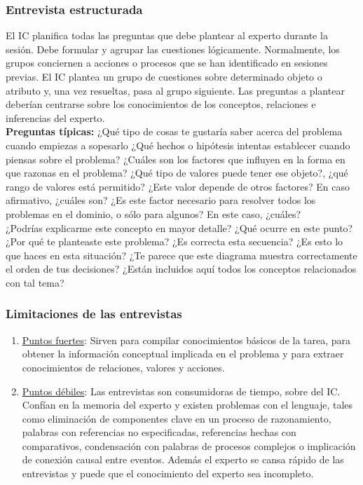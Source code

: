 \documentclass[12pt]{article}
\begin{document}
\subsubsection{Entrevista estructurada}
El IC planifica todas las preguntas que debe plantear al experto durante la sesión. Debe formular y agrupar las cuestiones lógicamente. Normalmente, los grupos conciernen a acciones o procesos que se han identificado en sesiones previas. El IC plantea un grupo de cuestiones sobre determinado objeto o atributo y, una vez resueltas, pasa al grupo siguiente. Las preguntas a plantear deberían centrarse sobre los conocimientos de los conceptos, relaciones e inferencias del experto.\\
\textbf{Preguntas típicas:} ¿Qué tipo de cosas te gustaría saber acerca del problema cuando empiezas a sopesarlo ¿Qué hechos o hipótesis intentas establecer cuando piensas sobre el problema? ¿Cuáles son los factores que influyen en la forma en que razonas en el problema? ¿Qué tipo de valores puede tener ese objeto?, ¿qué rango de valores está permitido? ¿Este valor depende de otros factores? En caso afirmativo, ¿cuáles son? ¿Es este factor necesario para resolver todos los problemas en el dominio, o sólo para algunos? En este caso, ¿cuáles?\\
¿Podrías explicarme este concepto en mayor detalle? ¿Qué ocurre en este punto? ¿Por qué te planteaste este problema? ¿Es correcta esta secuencia? ¿Es esto lo que haces en esta situación? ¿Te parece que este diagrama muestra correctamente el orden de tus decisiones? ¿Están incluidos aquí todos los conceptos relacionados con tal tema?

\subsubsection{Limitaciones de las entrevistas}
\begin{enumerate}
\item \underline{Puntos fuertes}: Sirven para compilar conocimientos básicos de la tarea, para obtener la información conceptual implicada en el problema y para extraer conocimientos de relaciones, valores y acciones.
\item \underline{Puntos débiles}: Las entrevistas son consumidoras de tiempo, sobre del IC. Confían en la memoria del experto y existen problemas con el lenguaje, tales como eliminación de componentes clave en un proceso de razonamiento, palabras con referencias no especificadas, referencias hechas con comparativos, condensación con palabras de procesos complejos o implicación de conexión causal entre eventos. Además el experto se cansa rápido de las entrevistas y puede que el conocimiento del experto sea incompleto.
\end{enumerate}
\end{document}
